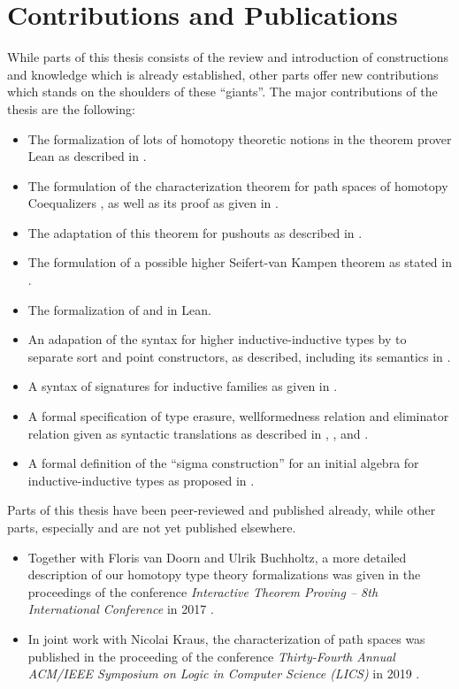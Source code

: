 \section{Contributions and Publications}

While parts of this thesis consists of the review and introduction of constructions
and knowledge which is already established,
other parts offer new contributions which stands on the shoulders of these ``giants''.
The major contributions of the thesis are the following:
\begin{itemize}
\item The formalization of lots of homotopy theoretic notions in the theorem prover
Lean as described in .
\item The formulation of the characterization theorem for path spaces
of homotopy Coequalizers , as well as its proof
as given in .
\item The adaptation of this theorem for pushouts as described in .
\item The formulation of a possible higher Seifert-van Kampen theorem
as stated in .
\item The formalization of  and 
in Lean.
\item An adapation of the syntax for higher inductive-inductive types by
\citet{ambrussyntax} to separate sort and point constructors, as described, including
its semantics in .
\item A syntax of signatures for inductive families as given in .
\item A formal specification of type erasure, wellformedness relation and eliminator
relation given as syntactic translations as described in ,
, and .
\item A formal definition of the ``sigma construction'' for an initial algebra
for inductive-inductive types as proposed in .
\end{itemize}

Parts of this thesis have been peer-reviewed and published already, while
other parts, especially  and  are not yet published
elsewhere.
\begin{itemize}
\item Together with Floris van Doorn and Ulrik Buchholtz, a more
detailed description of our homotopy type theory formalizations was given
in the proceedings of the conference \emph{Interactive Theorem Proving -- 8th International Conference}
in 2017 \citep{leanhott}.
\item In joint work with Nicolai Kraus, the characterization of path spaces
was published in the proceeding of the conference
\emph{Thirty-Fourth Annual ACM/IEEE Symposium on
Logic in Computer Science (LICS)} in 2019 \citep{paths}.
\end{itemize}

